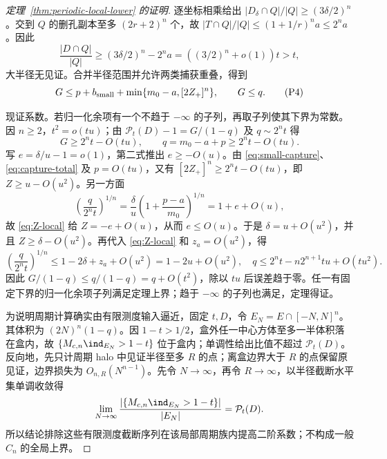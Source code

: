 \begin{proof}[定理~\ref{thm:periodic-local-lower} 的证明]
逐坐标相乘给出 $|D_\delta\cap Q|/|Q|\ge(3\delta/2)^n$。交到 $Q$ 的删孔副本至多 $(2r+2)^n$ 个，故
$|T\cap Q|/|Q|\le(1+1/r)^na\le2^na$。因此
\[
 \frac{|D\cap Q|}{|Q|}\ge(3\delta/2)^n-2^na
 =((3/2)^n+o(1))t>t,
\]
大半径无见证。合并半径范围并允许两类捕获重叠，得到
\[
 G\le p+b_{\rm small}+\min\{m_0-a,[2Z_+]^n\},\qquad G\le q.
 \tag{P4}\label{eq:capture-total}
\]

现证系数。若归一化余项有一个不趋于 $-\infty$ 的子列，再取子列使其下界为常数。因 $n\ge2$，$t^2=o(tu)$；由 $\mathcal P_t(D)-1=G/(1-q)$ 及 $q\sim2^nt$ 得
\[
 G\ge2^nt-O(tu),\qquad q=m_0-a+p\ge2^nt-O(tu).
\]
写 $e=\delta/u-1=o(1)$，第二式推出 $e\ge-O(u)$。由 \eqref{eq:small-capture}、\eqref{eq:capture-total} 及 $p=O(tu)$，又有
$[2Z_+]^n\ge2^nt-O(tu)$，即 $Z\ge u-O(u^2)$。另一方面
\[
 \left(\frac q{2^nt}\right)^{1/n}
 =\frac\delta u\left(1+\frac{p-a}{m_0}\right)^{1/n}
 =1+e+O(u),
\]
故 \eqref{eq:Z-local} 给 $Z=-e+O(u)$，从而 $e\le O(u)$。于是 $\delta=u+O(u^2)$，并且 $Z\ge\delta-O(u^2)$。再代入 \eqref{eq:Z-local} 和 $z_a=O(u^2)$，得
\[
 \left(\frac q{2^nt}\right)^{1/n}\le1-2\delta+z_a+O(u^2)
 =1-2u+O(u^2),
\quad q\le2^nt-n2^{n+1}tu+O(tu^2).
\]
因此 $G/(1-q)\le q/(1-q)=q+O(t^2)$，除以 $tu$ 后误差趋于零。任一有固定下界的归一化余项子列满足定理上界；趋于 $-\infty$ 的子列也满足，定理得证。

为说明周期计算确实由有限测度输入逼近，固定 $t,D$，令
$E_N=E\cap[-N,N]^n$。其体积为 $(2N)^n(1-q)$。因 $1-t>1/2$，盒外任一中心方体至多一半体积落在盒内，故 $\{M_{c,n}\ind_{E_N}>1-t\}$ 位于盒内；单调性给出比值不超过 $\mathcal P_t(D)$。反向地，先只计周期 halo 中见证半径至多 $R$ 的点；离盒边界大于 $R$ 的点保留原见证，边界损失为 $O_{n,R}(N^{n-1})$。先令 $N\to\infty$，再令 $R\to\infty$，以半径截断水平集单调收敛得
\[
 \lim_{N\to\infty}\frac{|\{M_{c,n}\ind_{E_N}>1-t\}|}{|E_N|}
 =\mathcal P_t(D).
\]
所以结论排除这些有限测度截断序列在该局部周期族内提高二阶系数；不构成一般 $C_n$ 的全局上界。

\end{proof}
